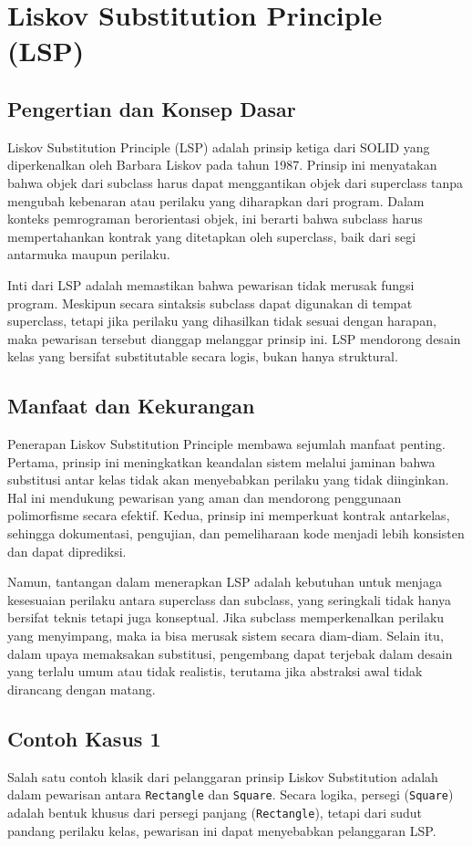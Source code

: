 \section{Liskov Substitution Principle (LSP)}

\subsection{Pengertian dan Konsep Dasar}
Liskov Substitution Principle (LSP) adalah prinsip ketiga dari SOLID yang diperkenalkan oleh Barbara Liskov pada tahun 1987. Prinsip ini menyatakan bahwa objek dari subclass harus dapat menggantikan objek dari superclass tanpa mengubah kebenaran atau perilaku yang diharapkan dari program. Dalam konteks pemrograman berorientasi objek, ini berarti bahwa subclass harus mempertahankan kontrak yang ditetapkan oleh superclass, baik dari segi antarmuka maupun perilaku.

Inti dari LSP adalah memastikan bahwa pewarisan tidak merusak fungsi program. Meskipun secara sintaksis subclass dapat digunakan di tempat superclass, tetapi jika perilaku yang dihasilkan tidak sesuai dengan harapan, maka pewarisan tersebut dianggap melanggar prinsip ini. LSP mendorong desain kelas yang bersifat substitutable secara logis, bukan hanya struktural.

\subsection{Manfaat dan Kekurangan}
Penerapan Liskov Substitution Principle membawa sejumlah manfaat penting. Pertama, prinsip ini meningkatkan keandalan sistem melalui jaminan bahwa substitusi antar kelas tidak akan menyebabkan perilaku yang tidak diinginkan. Hal ini mendukung pewarisan yang aman dan mendorong penggunaan polimorfisme secara efektif. Kedua, prinsip ini memperkuat kontrak antarkelas, sehingga dokumentasi, pengujian, dan pemeliharaan kode menjadi lebih konsisten dan dapat diprediksi.

Namun, tantangan dalam menerapkan LSP adalah kebutuhan untuk menjaga kesesuaian perilaku antara superclass dan subclass, yang seringkali tidak hanya bersifat teknis tetapi juga konseptual. Jika subclass memperkenalkan perilaku yang menyimpang, maka ia bisa merusak sistem secara diam-diam. Selain itu, dalam upaya memaksakan substitusi, pengembang dapat terjebak dalam desain yang terlalu umum atau tidak realistis, terutama jika abstraksi awal tidak dirancang dengan matang.

\subsection{Contoh Kasus 1}
Salah satu contoh klasik dari pelanggaran prinsip Liskov Substitution adalah dalam pewarisan antara \texttt{Rectangle} dan \texttt{Square}. Secara logika, persegi (\texttt{Square}) adalah bentuk khusus dari persegi panjang (\texttt{Rectangle}), tetapi dari sudut pandang perilaku kelas, pewarisan ini dapat menyebabkan pelanggaran LSP.

